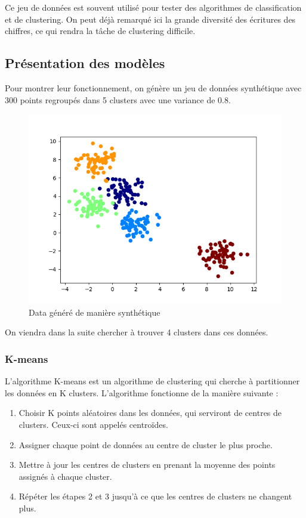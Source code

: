 \documentclass[french,a4paper,18pt]{article}
\begin{document}
Ce jeu de données est souvent utilisé pour tester des algorithmes de classification et de clustering.
On peut déjà remarqué ici la grande diversité des écritures des chiffres, ce qui rendra la tâche de clustering difficile.

\subsection{Présentation des modèles}
Pour montrer leur fonctionnement, on génère un jeu de données synthétique avec 300 points regroupés dans 5 clusters avec une variance de 0.8.
\begin{figure}[h]
    \centering
    \includegraphics[scale=0.5]{images/short_simulation_generate_data.png}
    \caption{Data généré de manière synthétique}\label{fig:short_simulation_data}
\end{figure}

On viendra dans la suite chercher à trouver 4 clusters dans ces données.

\subsubsection{K-means}

L'algorithme K-means est un algorithme de clustering qui cherche à partitionner les données en K clusters.
L'algorithme fonctionne de la manière suivante :
\begin{enumerate}
    \item Choisir K points aléatoires dans les données, qui serviront de centres de clusters. 
    Ceux-ci sont appelés centroïdes.
    \item Assigner chaque point de données au centre de cluster le plus proche.
    \item Mettre à jour les centres de clusters en prenant la moyenne des points assignés à chaque cluster.
    \item Répéter les étapes 2 et 3 jusqu'à ce que les centres de clusters ne changent plus.
\end{enumerate}
\end{document}

